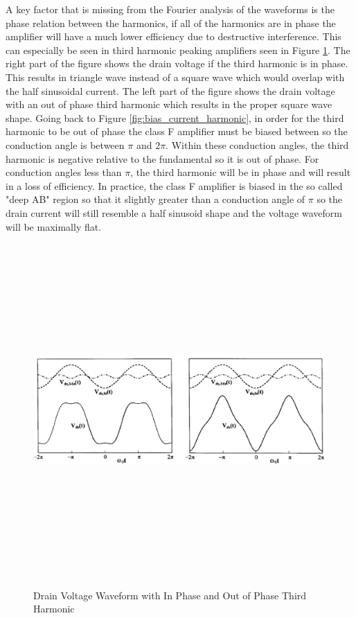 A key factor that is missing from the Fourier analysis of the waveforms is the phase relation between the harmonics, if all of the harmonics are in phase the amplifier will have a much lower efficiency due to destructive interference. This can especially be seen in third harmonic peaking amplifiers seen in Figure \ref{fig:third_harmonic_phase}. The right part of the figure shows the drain voltage if the third harmonic is in phase. This results in triangle wave instead of a square wave which would overlap with the half sinusoidal current. The left part of the figure shows the drain voltage with an out of phase third harmonic which results in the proper square wave shape. Going back to Figure \ref{fig:bias_current_harmonic}, in order for the third harmonic to be out of phase the class F amplifier must be biased between so the conduction angle is between $\pi$ and $2\pi$. Within these conduction angles, the third harmonic is negative relative to the fundamental so it is out of phase. For conduction angles less than $\pi$, the third harmonic will be in phase and will result in a loss of efficiency. In practice, the class F amplifier is biased in the so called "deep AB" region so that it slightly greater than a conduction angle of $\pi$ so the drain current will still resemble a half sinusoid shape and the voltage waveform will be maximally flat.

\begin{figure}
  \centering
  \includegraphics[width=5in,height=5in,keepaspectratio]{figures/detail/third_harmonic_phase}\\
  \caption{Drain Voltage Waveform with In Phase and Out of Phase Third Harmonic \cite{Colantonio1998}}
  \label{fig:third_harmonic_phase}
\end{figure}

